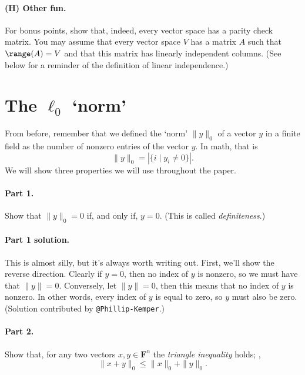 \documentclass[12pt,hidelinks]{article}
\newcommand{\field}{\mathbf{F}}
\begin{document}
\paragraph{(H) Other fun.} For bonus points, show that, indeed, every vector space
has a parity check matrix. You may assume that every vector space $V$ has a
matrix $A$ such that $\range(A) = V$ and that this matrix has linearly
independent columns. (See below for a reminder of the definition of linear
independence.)

\section{The $\ell_0$ `norm'}
From before, remember that we defined the `norm' $\|y\|_0$ of a vector $y$ in a
finite field as the number of nonzero entries of the vector $y$. In math,
that is
\[
    \|y\|_0 = |\{i\mid y_i \ne 0\}|.
\]
We will show three properties we will use throughout the paper.

\paragraph{Part 1.} Show that $\|y\|_0 = 0$ if, and only if, $y = 0$. (This
is called \emph{definiteness}.)


\begin{solution}

\paragraph{Part 1 solution.} This is almost silly, but it's always worth
writing out. First, we'll show the reverse direction. Clearly if $y=0$, then no
index of $y$ is nonzero, so we must have that $\|y\| = 0$. Conversely, let
$\|y\| = 0$, then this means that no index of $y$ is nonzero. In other words,
every index of $y$ is equal to zero, so $y$ must also be zero.
(Solution contributed by \verb|@Phillip-Kemper|.)
\end{solution}

\paragraph{Part 2.} Show that, for any two vectors $x, y \in \field^n$
the \emph{triangle inequality} holds; \ie,
\[
    \|x + y\|_0 \le \|x\|_0 + \|y\|_0.
\]
\end{document}
